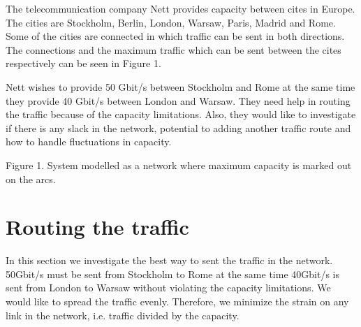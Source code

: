 The telecommunication company Nett provides capacity between cites in Europe. The cities are Stockholm, Berlin, London, Warsaw, Paris, Madrid and Rome. Some of the cities are connected in which traffic can be sent in both directions. The connections and the maximum traffic which can be sent between the cites respectively can be seen in Figure 1.

Nett wishes to provide 50 Gbit/s between Stockholm and Rome at the same time they provide 40 Gbit/s between London and Warsaw. They need help in routing the traffic because of the capacity limitations. Also, they would like to investigate if there is any slack in the network, potential to adding another traffic route and how to handle fluctuations in capacity.

\begin{center}
\end{center}
Figure 1. System modelled as a network where maximum capacity is marked out on the arcs.

\newpage

\section{Routing the traffic}
In this section we investigate the best way to sent the traffic in the network. 50Gbit/s must be sent from Stockholm to Rome at the same time 40Gbit/s is sent from London to Warsaw without violating the capacity limitations. We would like to spread the traffic evenly. Therefore, we minimize the strain on any link in the network, i.e. traffic divided by the capacity.

